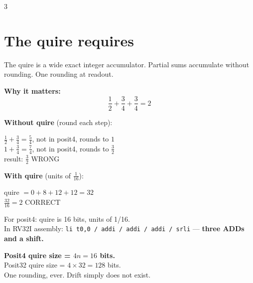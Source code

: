 \documentclass[10pt]{article}
\begin{document}
\newpage
\begin{multicols}{3}

\section*{The quire requires}

The quire is a wide exact integer accumulator.
Partial sums accumulate without rounding.
One rounding at readout.

\smallskip
\noindent \textbf{Why it matters:}
\[ \frac{1}{2} + \frac{3}{4} + \frac{3}{4} = 2 \]

\noindent \textbf{Without quire} (round each step):
\begin{center}\vspace{-4pt}
$\tfrac{1}{2}+\tfrac{3}{4}=\tfrac{5}{4}$, not in posit4, rounds to $1$\\[2pt]
$1+\tfrac{3}{4}=\tfrac{7}{4}$, not in posit4, rounds to $\tfrac{3}{2}$\\[2pt]
result: $\tfrac{3}{2}$ \quad WRONG
\end{center}\vspace{-6pt}

\noindent \textbf{With quire} (units of $\tfrac{1}{16}$):
\begin{center}\vspace{-4pt}
quire $= 0 + 8 + 12 + 12 = 32$\\[2pt]
$\tfrac{32}{16} = 2$ \quad CORRECT
\end{center}

\smallskip
For posit4: quire is 16 bits, units of 1/16.\\
In RV32I assembly: \texttt{li t0,0 / addi / addi / addi / srli} ---
\textbf{three ADDs and a shift.}

\medskip
\noindent \textbf{Posit4 quire size = $4n = 16$ bits.}\\
Posit32 quire size = $4 \times 32 = 128$ bits.\\
One rounding, ever. Drift simply does not exist.

\columnbreak


\end{multicols}
\end{document}
